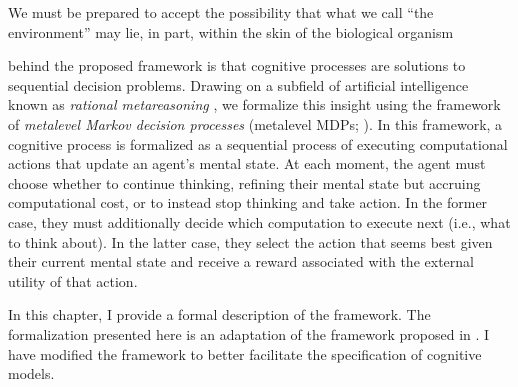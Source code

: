 \begin{savequote}[75mm]
We must be prepared to accept the possibility that what we call ``the environment'' may lie, in part, within the skin of the biological organism
\end{savequote}

\label{sec:formalism}

 behind the proposed framework is that cognitive processes are solutions to sequential decision problems. Drawing on a subfield of artificial intelligence known as \emph{rational metareasoning} \citep{matheson1968economic,russell1991principles}, we formalize this insight using the framework of \emph{metalevel Markov decision processes} (metalevel MDPs; \citealp{hay2012selecting}). In this framework, a cognitive process is formalized as a sequential process of executing computational actions that update an agent's mental state. At each moment, the agent must choose whether to continue thinking, refining their mental state but accruing computational cost, or to instead stop thinking and take action. In the former case, they must additionally decide which computation to execute next (i.e., what to think about). In the latter case, they select the action that seems best given their current mental state and receive a reward associated with the external utility of that action.


In this chapter, I provide a formal description of the framework. The formalization presented here is an adaptation of the framework proposed in \citet{hay2016principles}. I have modified the framework to better facilitate the specification of cognitive models.


